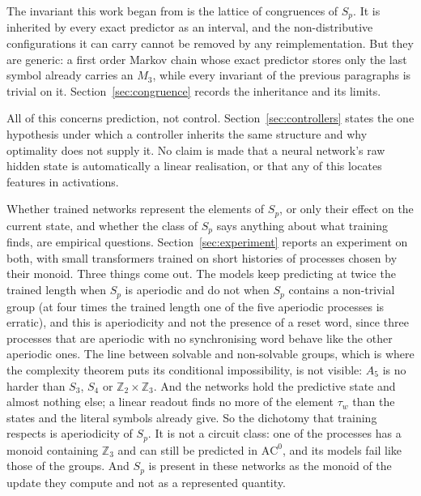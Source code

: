 \documentclass[10pt]{article}
\theoremstyle{definition}
\theoremstyle{remark}
\begin{document}
The invariant this work began from is the lattice of congruences of
$S_p$.  It is inherited by every exact predictor as an interval, and
the non-distributive configurations it can carry cannot be removed by
any reimplementation.  But they are generic: a first order Markov
chain whose exact predictor stores only the last symbol already
carries an $M_3$, while every invariant of the previous paragraphs is
trivial on it.  Section~\ref{sec:congruence} records the inheritance
and its limits.

All of this concerns prediction, not control.
Section~\ref{sec:controllers} states the one hypothesis under which a
controller inherits the same structure and why optimality does not
supply it.  No claim is made that a neural network's raw hidden state
is automatically a linear realisation, or that any of this locates
features in activations.

Whether trained networks represent the elements of $S_p$, or only
their effect on the current state, and whether the class of $S_p$
says anything about what training finds, are empirical questions.
Section~\ref{sec:experiment} reports an experiment on both, with
small transformers trained on short histories of processes chosen by
their monoid.  Three things come out.  The models keep predicting at
twice the trained length when $S_p$ is aperiodic and do not when
$S_p$ contains a non-trivial group (at four times the trained length
one of the five aperiodic processes is erratic), and this is
aperiodicity and not the presence of a reset
word, since three processes that are aperiodic with no synchronising
word behave like the other aperiodic ones.  The line between solvable
and non-solvable groups, which is where the complexity theorem puts
its conditional impossibility, is not visible: $A_5$ is no harder
than $S_3$, $S_4$ or $\mathbb Z_2\times\mathbb Z_3$.  And the
networks hold the predictive state and almost nothing else; a linear
readout finds no more of the element $\tau_w$ than the states and the
literal symbols already give.  So the dichotomy that training
respects is aperiodicity of $S_p$.  It is not a circuit class: one of
the processes has a monoid containing $\mathbb Z_3$ and can still be
predicted in $\mathrm{AC}^0$, and its models fail like those of the
groups.  And $S_p$ is present in these networks as the monoid of the
update they compute and not as a represented quantity.
\end{document}
